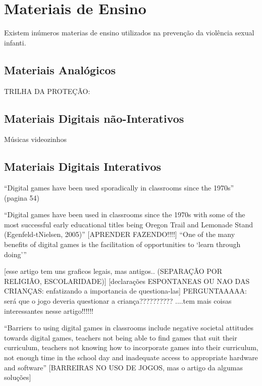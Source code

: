 \section{Materiais de Ensino}\label{sec:materiais}

Existem inúmeros materias de ensino utilizados na prevenção da violência sexual infanti.

\subsection{Materiais Analógicos}\label{ssec:analogico}%


TRILHA DA PROTEÇÃO: \cite{meyer2017analise}

\subsection{Materiais Digitais não-Interativos}\label{ssec:digitais}%

Músicas videozinhos

\subsection{Materiais Digitais Interativos}\label{ssec:jogos}%


``Digital games have been used sporadically in classrooms since the 1970s'' (pagina 54) \cite{dip2016advancing}

``Digital games have been used in classrooms since the 1970s with some of the most successful early educational titles being Oregon Trail and Lemonade Stand (Egenfeld-tNielsen, 2005)''\cite{dip2016advancing}
[APRENDER FAZENDO!!!!]
``One of the many benefits of digital games is the facilitation of opportunities to ‘learn through doing’'' \cite{dip2016advancing}

[esse artigo tem uns graficos legais, mas antigos.. (SEPARAÇÃO POR RELIGIÃO, ESCOLARIDADE)] [declarações ESPONTANEAS OU NAO DAS CRIANÇAS: enfatizando a importancia de questiona-las] PERGUNTAAAAA: será que o jogo deveria questionar a criança?????????? \cite{cardoso2016abuso} ....tem mais coisas interessantes nesse artigo!!!!!!


``Barriers to using digital games in classrooms include negative societal attitudes towards digital games, teachers not being able to find games that suit their curriculum, teachers not knowing how to incorporate games into their curriculum, not enough time in the school day and inadequate access to appropriate hardware and software'' [BARREIRAS NO USO DE JOGOS, mas o artigo da algumas soluções] \cite{dip2016advancing}

